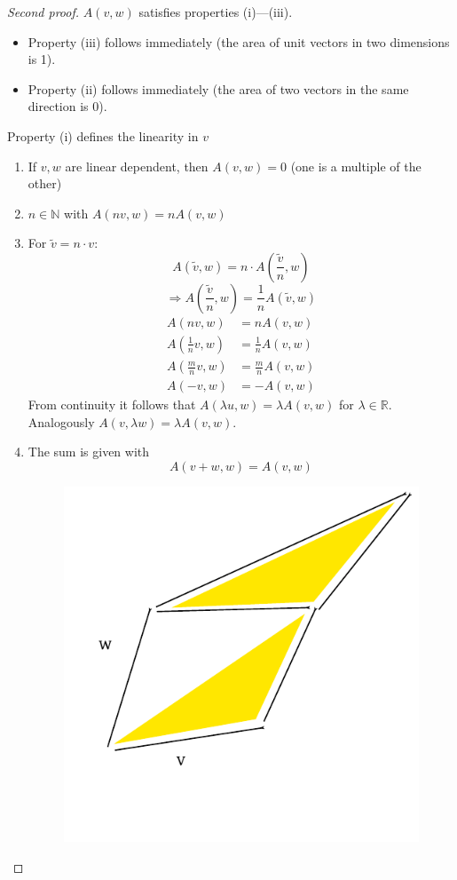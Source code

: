 \documentclass[a4paper,landscape,twocolumn]{article}
\begin{document}
\begin{proof}[Second proof]
  $A(v,w)$ satisfies properties (i)---(iii).
  \begin{itemize}
    \item Property (iii) follows immediately (the area of unit vectors in two dimensions is 1).
    \item Property (ii) follows immediately (the area of two vectors in the same direction is 0).
  \end{itemize}
  Property (i) defines the linearity in $v$
  \begin{enumerate}
    \item If $v,w$ are linear dependent, then $A(v,w) = 0$ (one is a multiple of the other)
    \item $n\in \mathbb N$ with $A(nv,w) = nA(v,w)$
    \item For $\tilde{v} = n \cdot v$:
      \[ A(\tilde{v}, w) = n \cdot A(\frac{\tilde{v}}{n}, w) \]
      \[ \Rightarrow A(\frac{\tilde{v}}{n}, w) = \frac1n A(\tilde{v}, w) \]
      \begin{align*}
        A(nv,w) &= n A(v,w) \\
        A(\frac1n v, w) &= \frac1n A(v,w) \\
        A(\frac mn v, w) &= \frac mn A(v,w) \\
        A(-v,w) &= -A(v,w)
      \end{align*}
      From continuity it follows that $A(\lambda u, w) = \lambda A(v, w)$ for $\lambda \in \mathbb R$.
      Analogously $A(v, \lambda w) = \lambda A(v, w)$.
    \item The sum is given with
      \[ A(v + w, w) = A(v, w) \]
      \begin{figure}[!h]
        \begin{center}
          \includegraphics{img/parallelogram-translation.pdf}

\end{center}
\end{figure}
\end{enumerate}
\end{proof}
\end{document}
